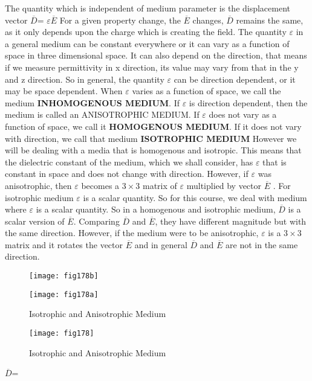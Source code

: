 The quantity which is independent of medium parameter is the displacement vector $\overline{D}$= $\varepsilon$$\overline{E}$
For a given property change, the $\overline{E}$ changes, $\overline{D}$ remains the same, as it only depends upon the charge which is creating the field. The quantity $\varepsilon$ in a general medium can be constant everywhere or it can vary as a function of space in three dimensional space. It can also depend on the direction, that means if we measure permittivity in x direction, its value may vary from that in the y and z direction. So in general, the quantity  $\varepsilon$  can be direction dependent, or it may be space dependent. When  $\varepsilon$  varies as a function of space, we call the medium \textbf{INHOMOGENOUS MEDIUM}. If  $\varepsilon$  is direction dependent, then the medium is called an ANISOTROPHIC MEDIUM. If  $\varepsilon$ does not vary as a function of space, we call it \textbf{HOMOGENOUS MEDIUM}. If it does not vary with direction, we call that medium \textbf{ISOTROPHIC MEDIUM}
However we will be dealing with a media that is homogenous and isotropic. This means that the dielectric constant of the medium, which we shall consider, has  $\varepsilon$ that is constant in space and does not change with direction. However, if  $\varepsilon$  was anisotrophic, then  $\varepsilon$  becomes a $3\times 3$ matrix of  $\varepsilon$  multiplied by vector $\overline{E}$ . For isotrophic medium  $\varepsilon$  is a scalar quantity. So for this course, we deal with medium where  $\varepsilon$  is a scalar quantity.
So in a homogenous and isotrophic medium,  $\overline{D}$ is a scalar version of  $\overline{E}$. Comparing  $\overline{D}$ and  $\overline{E}$, they have different magnitude but with the same direction. However, if the medium were to be anisotrophic,  $\varepsilon$ is a $3\times 3$ matrix and it rotates the vector  $\overline{E}$ and in general  $\overline{D}$ and  $\overline{E}$ are not in the same direction.
\begin{figure}[htbp]
	\centering
	\begin{minipage}{.25\textwidth}
		\centering
		\texttt{[image: fig178b]}
		\label{}
	\end{minipage}%
	\begin{minipage}{.25\textwidth}
		\centering
		\texttt{[image: fig178a]}
		\label{}
	\end{minipage}
	\caption{Isotrophic and Anisotrophic Medium}
\end{figure}
\begin{figure}
	\centering
	\texttt{[image: fig178]}
	\caption{Isotrophic and Anisotrophic Medium}
	\label{fig:grp-17-paint}
\end{figure}
$\overline{D}$=


